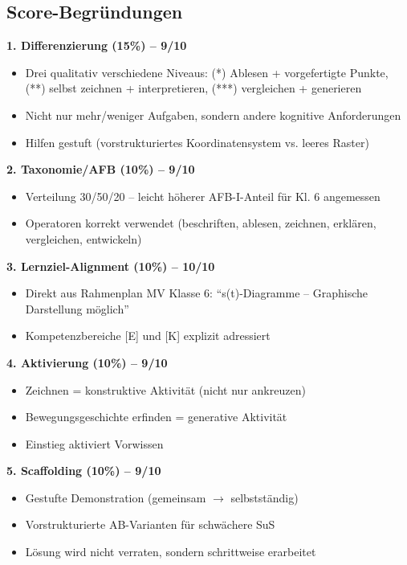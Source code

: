 \documentclass[11pt,a4paper]{article}
\begin{document}
\subsection{Score-Begründungen}

\textbf{1. Differenzierung (15\%) -- 9/10}
\begin{itemize}
    \item Drei qualitativ verschiedene Niveaus: (*) Ablesen + vorgefertigte Punkte, (**) selbst zeichnen + interpretieren, (***) vergleichen + generieren
    \item Nicht nur mehr/weniger Aufgaben, sondern andere kognitive Anforderungen
    \item Hilfen gestuft (vorstrukturiertes Koordinatensystem vs. leeres Raster)
\end{itemize}

\textbf{2. Taxonomie/AFB (10\%) -- 9/10}
\begin{itemize}
    \item Verteilung 30/50/20 -- leicht höherer AFB-I-Anteil für Kl. 6 angemessen
    \item Operatoren korrekt verwendet (beschriften, ablesen, zeichnen, erklären, vergleichen, entwickeln)
\end{itemize}

\textbf{3. Lernziel-Alignment (10\%) -- 10/10}
\begin{itemize}
    \item Direkt aus Rahmenplan MV Klasse 6: ``s(t)-Diagramme -- Graphische Darstellung möglich''
    \item Kompetenzbereiche [E] und [K] explizit adressiert
\end{itemize}

\textbf{4. Aktivierung (10\%) -- 9/10}
\begin{itemize}
    \item Zeichnen = konstruktive Aktivität (nicht nur ankreuzen)
    \item Bewegungsgeschichte erfinden = generative Aktivität
    \item Einstieg aktiviert Vorwissen
\end{itemize}

\textbf{5. Scaffolding (10\%) -- 9/10}
\begin{itemize}
    \item Gestufte Demonstration (gemeinsam $\to$ selbstständig)
    \item Vorstrukturierte AB-Varianten für schwächere SuS
    \item Lösung wird nicht verraten, sondern schrittweise erarbeitet
\end{itemize}
\end{document}
